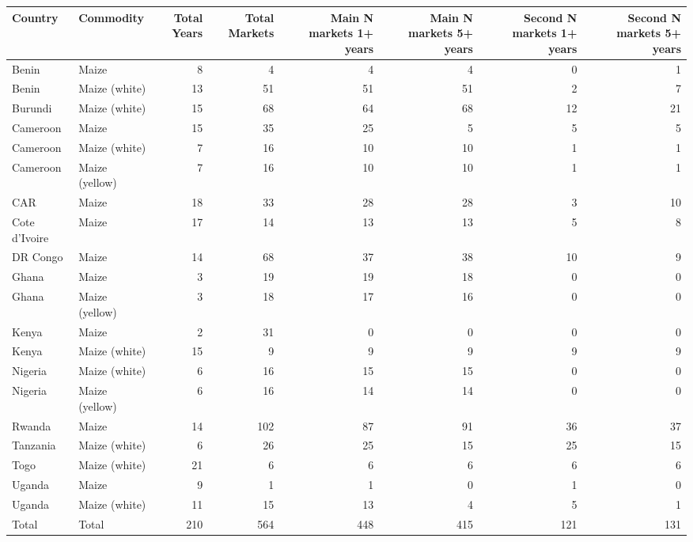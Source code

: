 \begin{table}[ht]
\centering
\begin{tabular}{llrrrrrr}
  \hline
Country & Commodity & Total Years & Total Markets & Main N markets 1+ years & Main N markets 5+ years & Second N markets 1+ years & Second N markets 5+ years \\ 
  \hline
Benin & Maize &   8 &   4 &   4 &   4 &   0 &   1 \\ 
  Benin & Maize (white) &  13 &  51 &  51 &  51 &   2 &   7 \\ 
  Burundi & Maize (white) &  15 &  68 &  64 &  68 &  12 &  21 \\ 
  Cameroon & Maize &  15 &  35 &  25 &   5 &   5 &   5 \\ 
  Cameroon & Maize (white) &   7 &  16 &  10 &  10 &   1 &   1 \\ 
  Cameroon & Maize (yellow) &   7 &  16 &  10 &  10 &   1 &   1 \\ 
  CAR & Maize &  18 &  33 &  28 &  28 &   3 &  10 \\ 
  Cote d'Ivoire & Maize &  17 &  14 &  13 &  13 &   5 &   8 \\ 
  DR Congo & Maize &  14 &  68 &  37 &  38 &  10 &   9 \\ 
  Ghana & Maize &   3 &  19 &  19 &  18 &   0 &   0 \\ 
  Ghana & Maize (yellow) &   3 &  18 &  17 &  16 &   0 &   0 \\ 
  Kenya & Maize &   2 &  31 &   0 &   0 &   0 &   0 \\ 
  Kenya & Maize (white) &  15 &   9 &   9 &   9 &   9 &   9 \\ 
  Nigeria & Maize (white) &   6 &  16 &  15 &  15 &   0 &   0 \\ 
  Nigeria & Maize (yellow) &   6 &  16 &  14 &  14 &   0 &   0 \\ 
  Rwanda & Maize &  14 & 102 &  87 &  91 &  36 &  37 \\ 
  Tanzania & Maize (white) &   6 &  26 &  25 &  15 &  25 &  15 \\ 
  Togo & Maize (white) &  21 &   6 &   6 &   6 &   6 &   6 \\ 
  Uganda & Maize &   9 &   1 &   1 &   0 &   1 &   0 \\ 
  Uganda & Maize (white) &  11 &  15 &  13 &   4 &   5 &   1 \\ 
  Total & Total & 210 & 564 & 448 & 415 & 121 & 131 \\ 
   \hline
\end{tabular}
\end{table}

